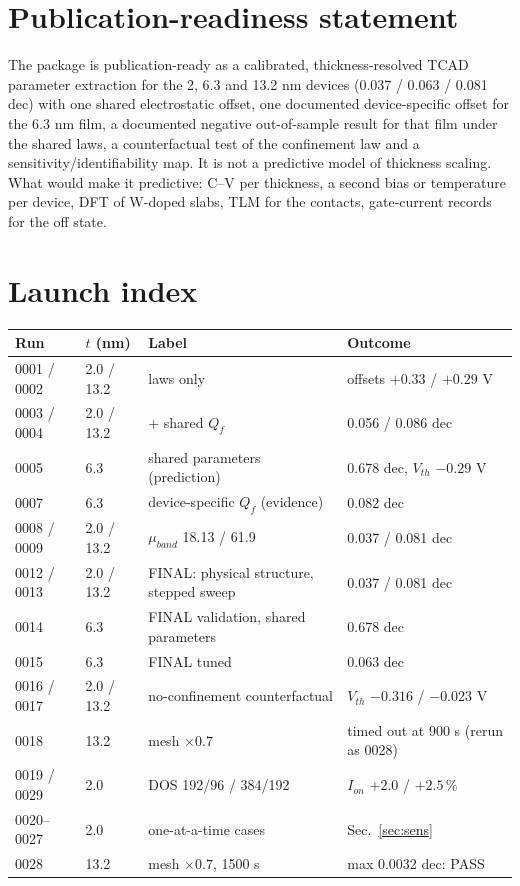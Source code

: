 \documentclass[11pt,a4paper]{article}
\begin{document}
\section{Publication-readiness statement}
The package is publication-ready as a calibrated, thickness-resolved TCAD parameter extraction for the 2, 6.3 and 13.2 nm devices (0.037 / 0.063 / 0.081 dec) with one shared electrostatic offset, one documented device-specific offset for the 6.3 nm film, a documented negative out-of-sample result for that film under the shared laws, a counterfactual test of the confinement law and a sensitivity/identifiability map. It is not a predictive model of thickness scaling. What would make it predictive: C--V per thickness, a second bias or temperature per device, DFT of W-doped slabs, TLM for the contacts, gate-current records for the off state.

\appendix
\section{Launch index}
\begin{longtable}{lllp{7cm}}\toprule
Run & $t$ (nm) & Label & Outcome\\\midrule\endhead
0001 / 0002 & 2.0 / 13.2 & laws only & offsets $+0.33$ / $+0.29$ V\\
0003 / 0004 & 2.0 / 13.2 & + shared $Q_f$ & 0.056 / 0.086 dec\\
0005 & 6.3 & shared parameters (prediction) & 0.678 dec, $V_{th}$ $-0.29$ V\\
0007 & 6.3 & device-specific $Q_f$ (evidence) & 0.082 dec\\
0008 / 0009 & 2.0 / 13.2 & $\mu_{band}$ 18.13 / 61.9 & 0.037 / 0.081 dec\\
0012 / 0013 & 2.0 / 13.2 & FINAL: physical structure, stepped sweep & 0.037 / 0.081 dec\\
0014 & 6.3 & FINAL validation, shared parameters & 0.678 dec\\
0015 & 6.3 & FINAL tuned & 0.063 dec\\
0016 / 0017 & 2.0 / 13.2 & no-confinement counterfactual & $V_{th}$ $-0.316$ / $-0.023$ V\\
0018 & 13.2 & mesh $\times0.7$ & timed out at 900 s (rerun as 0028)\\
0019 / 0029 & 2.0 & DOS 192/96 / 384/192 & $I_{on}$ $+2.0$ / $+2.5$\,\%\\
0020--0027 & 2.0 & one-at-a-time cases & Sec.~\ref{sec:sens}\\
0028 & 13.2 & mesh $\times0.7$, 1500 s & max 0.0032 dec: PASS\\
\bottomrule\end{longtable}
\end{document}

